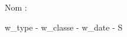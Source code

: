 

\setcounter{exo}{0}
\setcounter{que}{0}
\begin{minipage}{0.15\textwidth}
    Nom : 
\end{minipage}
\begin{minipage}{0.8\textwidth}
    \begin{flushright}
        {w_type} - {w_classe} - {w_date} - S
    \end{flushright}
\end{minipage}
\newline
\vspace{1pt}
\hrulefill 
\vspace{3pt}

